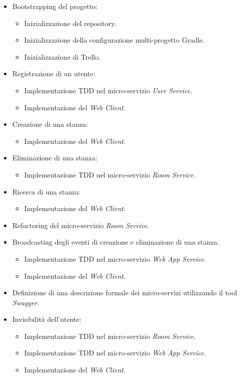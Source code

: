 \begin{itemize}
%
    \item Bootstrapping del progetto:
%
    \begin{itemize}
%
        \item Inizializzazione del repository.
%
        \item Inizializzazione della configurazione multi-progetto Gradle.
%
        \item Inizializzazione di Trello.
%
    \end{itemize}
%
    \item Registrazione di un utente:
%
    \begin{itemize}
%
        \item Implementazione TDD nel micro-servizio \textit{User Service}.
%
        \item Implementazione del \textit{Web Client}.
%
    \end{itemize}
%
    \item Creazione di una stanza:
%
    \begin{itemize}
%
        \item Implementazione del \textit{Web Client}.
%
    \end{itemize}
%
    \item Eliminazione di una stanza:
%
    \begin{itemize}
%
        \item Implementazione TDD nel micro-servizio \textit{Room Service}.
%
    \end{itemize}
%
    \item Ricerca di una stanza:
%
    \begin{itemize}
%
        \item Implementazione del \textit{Web Client}.
%
    \end{itemize}
%
    \item Refactoring del micro-servizio \textit{Room Service}.
%
    \item Broadcasting degli eventi di creazione e eliminazione di una stanza.
%
    \begin{itemize}
%
        \item Implementazione TDD nel micro-servizio \textit{Web App Service}.
%
        \item Implementazione del \textit{Web Client}.
%
    \end{itemize}
%
    \item Definizione di una descrizione formale dei micro-servizi utilizzando il tool \textit{Swagger}.
%
    \item Invisibilità dell'utente:
%
    \begin{itemize}
%
        \item Implementazione TDD nel micro-servizio \textit{Room Service}.
%
        \item Implementazione TDD nel micro-servizio \textit{Web App Service}.
%
        \item Implementazione del \textit{Web Client}.
%
    \end{itemize}
%
\end{itemize}

